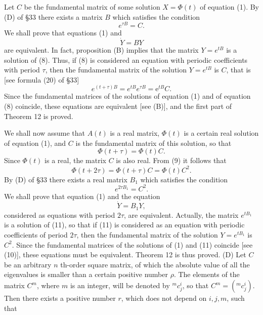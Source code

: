 \documentclass[10pt,a5paper]{book}
\makeatletter
\theoremstyle{plain}
\theoremstyle{definition}
\theoremstyle{remark}
\renewenvironment{proof}[1][\proofname]{\par
  \pushQED{\qed}%
  \normalfont\topsep6\p@\@plus6\p@\relax
  \trivlist
  \item\relax{\itshape #1\@addpunct{.}}\hspace\labelsep\ignorespaces
}{\popQED\endtrivlist\@endpefalse}
\makeatother
\begin{document}
\begin{proof}[Proof of Theorem 12]
Let $C$ be the fundamental matrix of some solution $X=\Phi(t)$ of equation (1). By (D) of §33 there exists a matrix $B$ which satisfies the condition
\[
e^{\tau B}=C .
\]
We shall prove that equations (1) and
\begin{equation*}
\dot{Y}=B Y \tag{8}
\end{equation*}
are equivalent. In fact, proposition (B) implies that the matrix $Y=e^{t B}$ is a solution of (8). Thus, if (8) is considered an equation with periodic coefficients with period $\tau$, then the fundamental matrix of the solution $Y=e^{t B}$ is $C$, that is [see formula (20) of §33]
\[
e^{(t+\tau) B}=e^{t B} e^{\tau B}=\mathrm{e}^{t B} C .
\]
Since the fundamental matrices of the solutions of equation (1) and of equation (8) coincide, these equations are equivalent [see (B)], and the first part of Theorem 12 is proved.

We shall now assume that $A(t)$ is a real matrix, $\Phi(t)$ is a certain real solution of equation (1), and $C$ is the fundamental matrix of this solution, so that
\begin{equation*}
\Phi(t+\tau)=\Phi(t) C . \tag{9}
\end{equation*}
Since $\Phi(t)$ is a real, the matrix $C$ is also real. From (9) it follows that
\begin{equation*}
\Phi(t+2 \tau)=\Phi(t+\tau) C=\Phi(t) C^{2} . \tag{10}
\end{equation*}
By (D) of §33 there exists a real matrix $B_{1}$ which satisfies the condition
\[
e^{2 \tau B_{1}}=C^{2} .
\]
We shall prove that equation (1) and the equation
\begin{equation*}
\dot{Y}=B_{1} Y, \tag{11}
\end{equation*}
considered as equations with period $2 \tau$, are equivalent. Actually, the matrix $e^{t B_{1}}$ is a solution of (11), so that if (11) is considered as an equation with periodic coefficients of period $2 \tau$, then the fundamental matrix of the solution $Y=e^{t B_{1}}$ is $C^{2}$. Since the fundamental matrices of the solutions of (1) and (11) coincide [see (10)], these equations must be equivalent. Theorem 12 is thus proved.
\end{proof}
(D) Let $C$ be an arbitrary $n$ th-order square matrix, of which the absolute value of all the eigenvalues is smaller than a certain positive number $\rho$. The elements of the matrix $C^{m}$, where $m$ is an integer, will be denoted by ${ }^{m} c_{j}^{i}$, so that $C^{m}=\left({ }^{m} c_{j}^{i}\right)$. Then there exists a positive number $r$, which does not depend on $i, j, m$, such that
\end{document}

